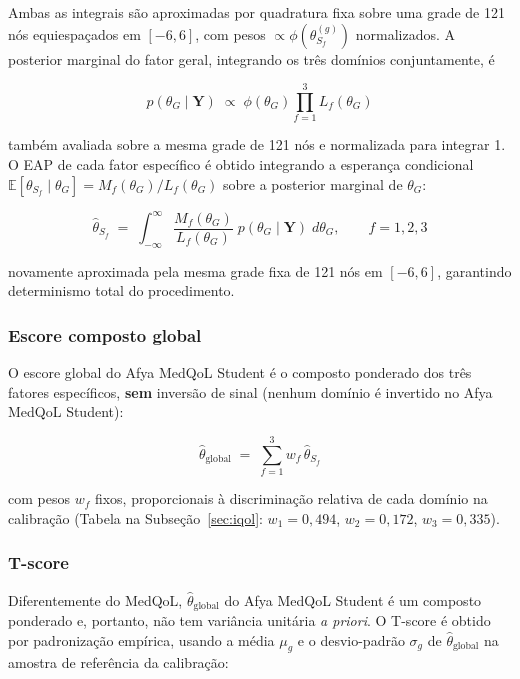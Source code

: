 \documentclass[12pt,a4paper]{article}
\begin{document}
Ambas as integrais são aproximadas por quadratura fixa sobre uma grade de
121 nós equiespaçados em $[-6,6]$, com pesos $\propto \phi(\theta_{S_f}^{(g)})$
normalizados. A posterior marginal do fator geral, integrando os três
domínios conjuntamente, é

\begin{equation}
p(\theta_G \mid \mathbf{Y}) \;\propto\; \phi(\theta_G) \prod_{f=1}^{3} L_f(\theta_G)
\label{eq:iqol-postG}
\end{equation}

também avaliada sobre a mesma grade de 121 nós e normalizada para integrar 1.
O EAP de cada fator específico é obtido integrando a esperança condicional
$\mathbb{E}[\theta_{S_f} \mid \theta_G] = M_f(\theta_G)/L_f(\theta_G)$ sobre
a posterior marginal de $\theta_G$:

\begin{equation}
\hat\theta_{S_f} \;=\; \int_{-\infty}^{\infty}
\frac{M_f(\theta_G)}{L_f(\theta_G)} \; p(\theta_G \mid \mathbf{Y}) \; d\theta_G,
\qquad f = 1,2,3
\label{eq:iqol-eap}
\end{equation}

novamente aproximada pela mesma grade fixa de 121 nós em $[-6,6]$, garantindo
determinismo total do procedimento.

\subsubsection{Escore composto global}

O escore global do Afya MedQoL Student é o composto ponderado dos três fatores específicos,
\textbf{sem} inversão de sinal (nenhum domínio é invertido no Afya MedQoL Student):

\begin{equation}
\hat\theta_{\text{global}} \;=\; \sum_{f=1}^{3} w_f \, \hat\theta_{S_f}
\label{eq:iqol-global-theta}
\end{equation}

com pesos $w_f$ fixos, proporcionais à discriminação relativa de cada
domínio na calibração (Tabela na Subseção~\ref{sec:iqol}: $w_1=0{,}494$,
$w_2=0{,}172$, $w_3=0{,}335$).

\subsubsection{T-score}

Diferentemente do MedQoL, $\hat\theta_{\text{global}}$ do Afya MedQoL Student é um composto
ponderado e, portanto, não tem variância unitária \emph{a priori}. O T-score
é obtido por padronização empírica, usando a média $\mu_g$ e o desvio-padrão
$\sigma_g$ de $\hat\theta_{\text{global}}$ na amostra de referência da
calibração:
\end{document}
